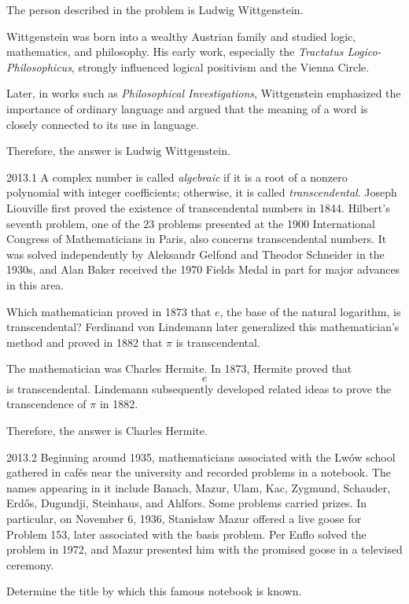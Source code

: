     \begin{solution}
        The person described in the problem is Ludwig Wittgenstein.

        Wittgenstein was born into a wealthy Austrian family and studied logic, mathematics, and
        philosophy. His early work, especially the \textit{Tractatus Logico-Philosophicus}, strongly
        influenced logical positivism and the Vienna Circle.

        Later, in works such as \textit{Philosophical Investigations}, Wittgenstein emphasized the
        importance of ordinary language and argued that the meaning of a word is closely connected
        to its use in language.

        Therefore, the answer is $\boxed{\text{Ludwig Wittgenstein}}$.
    \end{solution}

    \begin{pastproblem}{2013.1}
        A complex number is called \emph{algebraic} if it is a root of a nonzero polynomial with
        integer coefficients; otherwise, it is called \emph{transcendental}. Joseph Liouville first
        proved the existence of transcendental numbers in 1844. Hilbert's seventh problem, one of
        the $23$ problems presented at the 1900 International Congress of Mathematicians in Paris,
        also concerns transcendental numbers. It was solved independently by Aleksandr Gelfond and
        Theodor Schneider in the 1930s, and Alan Baker received the 1970 Fields Medal in part for
        major advances in this area.

        Which mathematician proved in 1873 that $e$, the base of the natural logarithm, is
        transcendental? Ferdinand von Lindemann later generalized this mathematician's method and
        proved in 1882 that $\pi$ is transcendental.
    \end{pastproblem}

    \begin{solution}
        The mathematician was Charles Hermite. In 1873, Hermite proved that
        \[
            e
        \]
        is transcendental. Lindemann subsequently developed related ideas to prove the
        transcendence of $\pi$ in 1882.

        Therefore, the answer is $\boxed{\text{Charles Hermite}}$.
    \end{solution}

    \begin{pastproblem}{2013.2}
        Beginning around 1935, mathematicians associated with the Lw\'ow school gathered in cafés
        near the university and recorded problems in a notebook. The names appearing in it include
        Banach, Mazur, Ulam, Kac, Zygmund, Schauder, Erd\H{o}s, Dugundji, Steinhaus, and Ahlfors.
        Some problems carried prizes. In particular, on November 6, 1936, Stanis{\l}aw Mazur offered a
        live goose for Problem 153, later associated with the basis problem. Per Enflo solved the
        problem in 1972, and Mazur presented him with the promised goose in a televised ceremony.

        Determine the title by which this famous notebook is known.
    \end{pastproblem}

